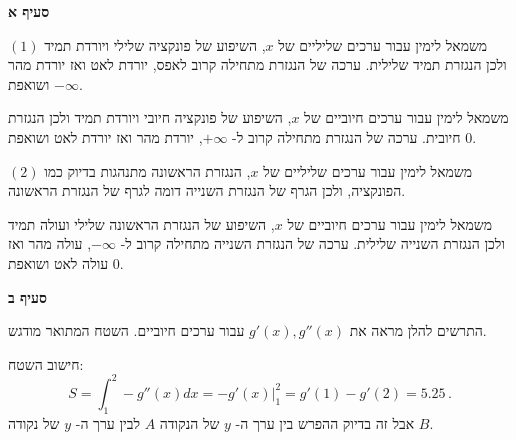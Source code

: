 \np

\textbf{סעיף א}

$(1)$
משמאל לימין עבור ערכים שליליים של 
$x$,
השיפוע של פונקציה שלילי ויורדת תמיד ולכן הנגזרת תמיד שלילית. ערכה של הנגזרת מתחילה קרוב לאפס, יורדת לאט ואז יורדת מהר ושואפת 
$-\infty$.

משמאל לימין עבור ערכים חיוביים של 
$x$,
השיפוע של פונקציה חיובי ויורדת תמיד ולכן הנגזרת חיובית. ערכה של הנגזרת מתחילה קרוב ל-%
$+\infty$,
יורדת מהר ואז יורדת לאט ושואפת 
$0$.


$(2)$
משמאל לימין עבור ערכים שליליים של 
$x$,
הנגזרת הראשונה מתנהגות בדיוק כמו הפונקציה, ולכן הגרף של הנגזרת השנייה דומה לגרף של הנגזרת הראשונה.

משמאל לימין עבור ערכים חיוביים של 
$x$,
השיפוע של הנגזרת הראשונה שלילי ועולה תמיד ולכן הנגזרת השנייה שלילית. ערכה של הנגזרת השנייה מתחילה קרוב ל-%
$-\infty$,
עולה מהר ואז עולה לאט ושואפת 
$0$.

\medskip

\textbf{סעיף ב}

התרשים להלן מראה את
$g'(x),g''(x)$
עבור ערכים חיוביים. השטח המתואר מודגש.

\begin{center}
\end{center}
חישוב השטח:
\[
S=\int_1^2 -g''(x) dx = \left.-g'(x)\right|_1^2=g'(1)-g'(2)=5.25\,.
\]
אבל זה בדיוק ההפרש בין ערך ה-%
$y$
של הנקודה
$A$
לבין ערך ה-%
$y$
של נקודה 
$B$.

\medskip

